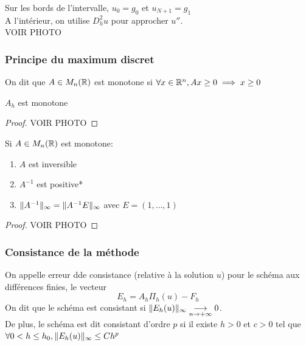 \documentclass[]{report}
\begin{document}
    Sur les bords de l'intervalle, $u_0=g_0$ et $u_{N+1}=g_1$\\
    A l'intérieur, on utilise $D_h^2 u $ pour approcher $u''$.\\
    VOIR PHOTO
    \subsubsection*{Principe du maximum discret}

    \begin{df}{}{}
        On dit que $A\in M_n(\mathbb{R})$ est monotone si $\forall x\in \mathbb{R}^n,Ax\ge 0\implies x\ge 0$
    \end{df}

    \begin{tm}{}{}
        $A_h$ est monotone
    \end{tm}

    \begin{proof}
        VOIR PHOTO
    \end{proof}

    \begin{tm}{}{}
        Si $A\in M_n(\mathbb{R})$ est monotone:
        \begin{enumerate}
            \item $A$ est inversible
            \item $A^{-1}$ est positive*
            \item $\lVert A^{-1} \rVert_\infty=\lVert A^{-1}E \rVert_\infty$ avec $E=(1,\ldots,1)$
        \end{enumerate}
    \end{tm}

    \begin{proof}
        VOIR PHOTO
    \end{proof}

    \subsubsection*{Consistance de la méthode}

    \begin{df}{}{}
        On appelle erreur dde consistance (relative à la solution $u$) pour le schéma aux différences finies, le vecteur
        \[E_h=A_h \Pi_h(u)-F_h\]
        On dit que le schéma est consistant si $\lVert E_h(u) \rVert_\infty\underset{n\to +\infty}{\longrightarrow} 0$.\\
        De plus, le schéma est dit consistant d'ordre $p$ si il existe $h>0$ et $c>0$ tel que $\forall 0<h\le h_0, \lVert E_h(u) \rVert_\infty\le Ch^p$
    \end{df}
\end{document}
